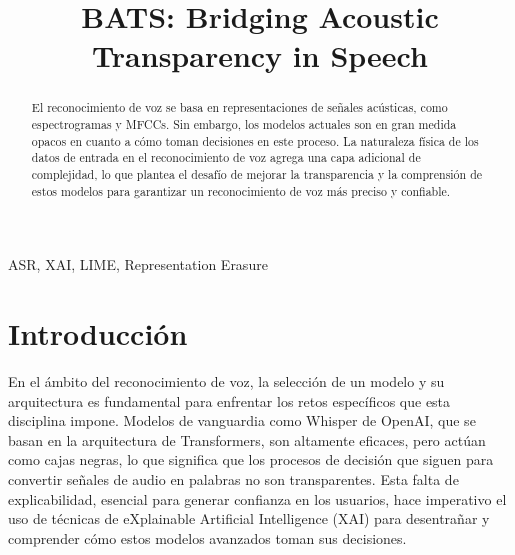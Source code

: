\documentclass[conference]{IEEEtran}
\begin{document}
\title{BATS: Bridging Acoustic Transparency in Speech}

\author{
\and
{}
}

\maketitle

\begin{abstract}

El reconocimiento de voz se basa en representaciones de señales acústicas, como espectrogramas y MFCCs. Sin embargo, los modelos actuales son en gran medida opacos en cuanto a cómo toman decisiones en este proceso. La naturaleza física de los datos de entrada en el reconocimiento de voz agrega una capa adicional de complejidad, lo que plantea el desafío de mejorar la transparencia y la comprensión de estos modelos para garantizar un reconocimiento de voz más preciso y confiable.

\end{abstract}

\begin{IEEEkeywords}
ASR, XAI, LIME, Representation Erasure
\end{IEEEkeywords}

\section{Introducción}

En el ámbito del reconocimiento de voz, la selección de un modelo y su arquitectura es fundamental para enfrentar los retos específicos que esta disciplina impone. Modelos de vanguardia como Whisper de OpenAI, que se basan en la arquitectura de Transformers, son altamente eficaces, pero actúan como cajas negras, lo que significa que los procesos de decisión que siguen para convertir señales de audio en palabras no son transparentes. Esta falta de explicabilidad, esencial para generar confianza en los usuarios, hace imperativo el uso de técnicas de eXplainable Artificial Intelligence (XAI) para desentrañar y comprender cómo estos modelos avanzados toman sus decisiones.
\end{document}
